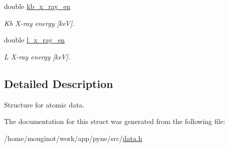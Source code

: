 \begin{DoxyCompactItemize}
double \hyperlink{structpyne_1_1atomic_aa93013778d65dc071c27564449e351de}{kb\+\_\+x\+\_\+ray\+\_\+en}
\begin{DoxyCompactList}\small\item\em Kb X-\/ray energy \mbox{[}keV\mbox{]}. \end{DoxyCompactList}\item 
\mbox{\label{structpyne_1_1atomic_a43e9e36e9b5bd8e4e77ffbe86b5ef28d}} 
double \hyperlink{structpyne_1_1atomic_a43e9e36e9b5bd8e4e77ffbe86b5ef28d}{l\+\_\+x\+\_\+ray\+\_\+en}
\begin{DoxyCompactList}\small\item\em L X-\/ray energy \mbox{[}keV\mbox{]}. \end{DoxyCompactList}\end{DoxyCompactItemize}


\subsection{Detailed Description}
Structure for atomic data. 

The documentation for this struct was generated from the following file\+:\begin{DoxyCompactItemize}
\item 
/home/mouginot/work/app/pyne/src/\hyperlink{data_8h}{data.\+h}\end{DoxyCompactItemize}
